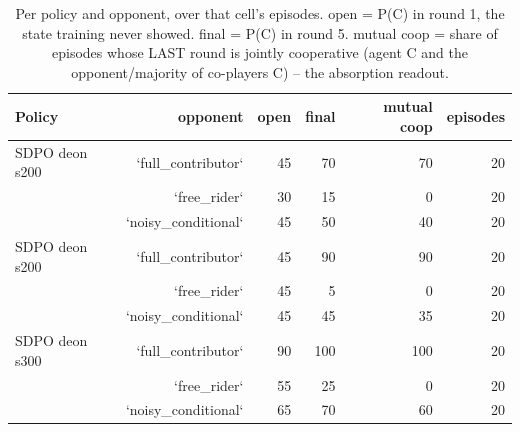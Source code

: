 \begin{table}[t]
\centering
\caption{Per policy and opponent, over that cell's episodes. open = P(C) in round 1, the state training never showed. final = P(C) in round 5. mutual coop = share of episodes whose LAST round is jointly cooperative (agent C and the opponent/majority of co-players C) -- the absorption readout.}
\label{tab:mr-outcomes}
\small
\setlength{\tabcolsep}{3.5pt}
\begin{tabular}{lrrrrr}
\toprule
Policy & opponent & open & final & mutual coop & episodes \\
\midrule
SDPO deon s200 & `full_contributor` & 45 & 70 & 70 & 20 \\
 & `free_rider` & 30 & 15 & 0 & 20 \\
 & `noisy_conditional` & 45 & 50 & 40 & 20 \\
SDPO deon s200 & `full_contributor` & 45 & 90 & 90 & 20 \\
 & `free_rider` & 45 & 5 & 0 & 20 \\
 & `noisy_conditional` & 45 & 45 & 35 & 20 \\
SDPO deon s300 & `full_contributor` & 90 & 100 & 100 & 20 \\
 & `free_rider` & 55 & 25 & 0 & 20 \\
 & `noisy_conditional` & 65 & 70 & 60 & 20 \\
\bottomrule
\end{tabular}
\end{table}
